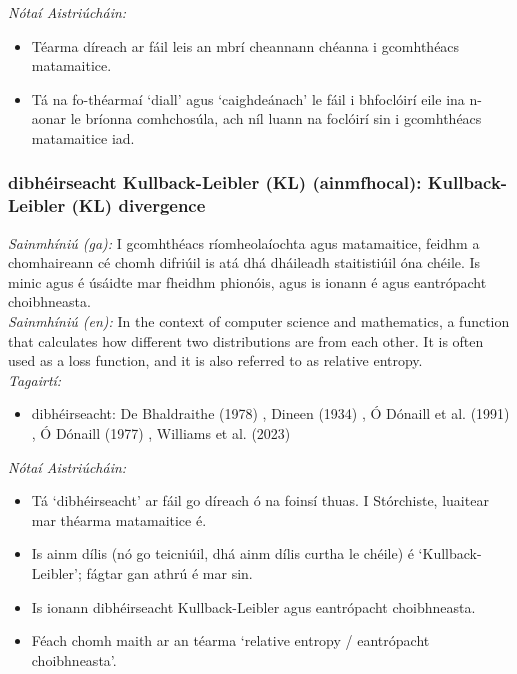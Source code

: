 \documentclass{article}
\begin{document}
 \noindent \textit{Nótaí Aistriúcháin:}
\begin{itemize}
	\item Téarma díreach ar fáil leis an mbrí cheannann chéanna i gcomhthéacs matamaitice.
	\item Tá na fo-théarmaí `diall' agus `caighdeánach' le fáil i bhfoclóirí eile ina n-aonar le bríonna comhchosúla, ach níl luann na foclóirí sin i gcomhthéacs matamaitice iad.
\end{itemize}


\subsubsection*{dibhéirseacht Kullback-Leibler (KL) (ainmfhocal): Kullback-Leibler (KL) divergence}
 \noindent \textit{Sainmhíniú (ga):} I gcomhthéacs ríomheolaíochta agus matamaitice, feidhm a chomhaireann cé chomh difriúil is atá dhá dháileadh staitistiúil óna chéile. Is minic agus é úsáidte mar fheidhm phionóis, agus is ionann é agus eantrópacht choibhneasta.
\\
 \noindent \textit{Sainmhíniú (en):} In the context of computer science and mathematics, a function that calculates how different two distributions are from each other. It is often used as a loss function, and it is also referred to as relative entropy.
\\
 \noindent \textit{Tagairtí:}
\begin{itemize}
	\item dibhéirseacht: De Bhaldraithe (1978) \cite{de-bhaldraithe}, Dineen (1934) \cite{dineen}, Ó Dónaill et al. (1991) \cite{focloir-beag}, Ó Dónaill (1977) \cite{odonaill}, Williams et al. (2023) \cite{storchiste}
\end{itemize}

 \noindent \textit{Nótaí Aistriúcháin:}
\begin{itemize}
	\item Tá `dibhéirseacht' ar fáil go díreach ó na foinsí thuas. I Stórchiste, luaitear mar théarma matamaitice é.
	\item Is ainm dílis (nó go teicniúil, dhá ainm dílis curtha le chéile) é `Kullback-Leibler'; fágtar gan athrú é mar sin.
	\item Is ionann dibhéirseacht Kullback-Leibler agus eantrópacht choibhneasta.
	\item Féach chomh maith ar an téarma `relative entropy / eantrópacht choibhneasta'.
\end{itemize}
\end{document}
